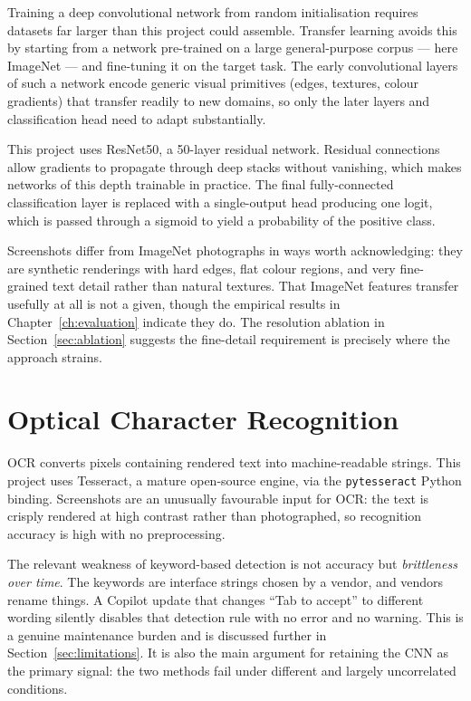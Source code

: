 \documentclass[12pt,oneside]{report}
\newcommand{\code}[1]{\texttt{\small #1}}
\begin{document}
Training a deep convolutional network from random initialisation requires
datasets far larger than this project could assemble. Transfer learning avoids
this by starting from a network pre-trained on a large general-purpose corpus
--- here ImageNet --- and fine-tuning it on the target task. The early
convolutional layers of such a network encode generic visual primitives (edges,
textures, colour gradients) that transfer readily to new domains, so only the
later layers and classification head need to adapt substantially.

This project uses ResNet50, a 50-layer residual network. Residual connections
allow gradients to propagate through deep stacks without vanishing, which makes
networks of this depth trainable in practice. The final fully-connected
classification layer is replaced with a single-output head producing one logit,
which is passed through a sigmoid to yield a probability of the positive class.

Screenshots differ from ImageNet photographs in ways worth acknowledging: they
are synthetic renderings with hard edges, flat colour regions, and very
fine-grained text detail rather than natural textures. That ImageNet features
transfer usefully at all is not a given, though the empirical results in
Chapter~\ref{ch:evaluation} indicate they do. The resolution ablation in
Section~\ref{sec:ablation} suggests the fine-detail requirement is precisely
where the approach strains.

\section{Optical Character Recognition}
\label{sec:ocr}

OCR converts pixels containing rendered text into machine-readable strings.
This project uses Tesseract, a mature open-source engine, via the
\code{pytesseract} Python binding. Screenshots are an unusually favourable
input for OCR: the text is crisply rendered at high contrast rather than
photographed, so recognition accuracy is high with no preprocessing.

The relevant weakness of keyword-based detection is not accuracy but
\emph{brittleness over time}. The keywords are interface strings chosen by a
vendor, and vendors rename things. A Copilot update that changes ``Tab to
accept'' to different wording silently disables that detection rule with no
error and no warning. This is a genuine maintenance burden and is discussed
further in Section~\ref{sec:limitations}. It is also the main argument for
retaining the CNN as the primary signal: the two methods fail under different
and largely uncorrelated conditions.
\end{document}
